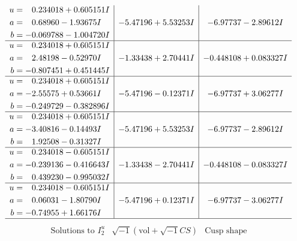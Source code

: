 \documentclass[1p]{elsarticle_modified}
\theoremstyle{definition}
\newcommand{\I}{\sqrt{-1}}
\begin{document}
$$\begin{array}{c|c|c}
\begin{aligned}
u &= \phantom{-}0.234018 + 0.605151 I \\
a &= \phantom{-}0.68960 - 1.93675 I \\
b &= -0.069788 - 1.004720 I\end{aligned}
 & -5.47196 + 5.53253 I & -6.97737 - 2.89612 I \\ \hline\begin{aligned}
u &= \phantom{-}0.234018 + 0.605151 I \\
a &= \phantom{-}2.48198 - 0.52970 I \\
b &= -0.807451 + 0.451445 I\end{aligned}
 & -1.33438 + 2.70441 I & -0.448108 + 0.083327 I \\ \hline\begin{aligned}
u &= \phantom{-}0.234018 + 0.605151 I \\
a &= -2.55575 + 0.53661 I \\
b &= -0.249729 - 0.382896 I\end{aligned}
 & -5.47196 - 0.12371 I & -6.97737 + 3.06277 I \\ \hline\begin{aligned}
u &= \phantom{-}0.234018 + 0.605151 I \\
a &= -3.40816 - 0.14493 I \\
b &= \phantom{-}1.92508 - 0.31327 I\end{aligned}
 & -5.47196 + 5.53253 I & -6.97737 - 2.89612 I \\ \hline\begin{aligned}
u &= \phantom{-}0.234018 - 0.605151 I \\
a &= -0.239136 - 0.416643 I \\
b &= \phantom{-}0.439230 - 0.995032 I\end{aligned}
 & -1.33438 - 2.70441 I & -0.448108 - 0.083327 I \\ \hline\begin{aligned}
u &= \phantom{-}0.234018 - 0.605151 I \\
a &= \phantom{-}0.06031 - 1.80790 I \\
b &= -0.74955 + 1.66176 I\end{aligned}
 & -5.47196 + 0.12371 I & -6.97737 - 3.06277 I\\
 \hline 
 \end{array}$$\newpage$$\begin{array}{c|c|c}  
\text{Solutions to }I^u_{2}& \I (\text{vol} + \sqrt{-1}CS) & \text{Cusp shape}\\
 \hline 
\begin{aligned}

\end{aligned}
\end{array}$$
\end{document}
